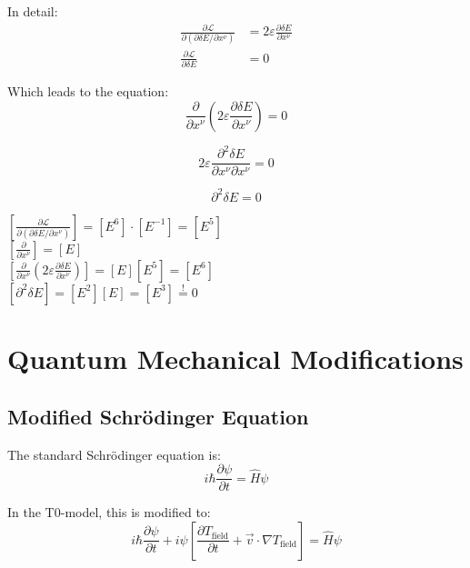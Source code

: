 \documentclass[12pt,a4paper]{article}
\newcommand{\tfield}{T_{\text{field}}}
\newcommand{\dfield}{\delta E}
\theoremstyle{definition}
\begin{document}
	In detail:
	\begin{align}
		\frac{\partial \mathcal{L}}{\partial(\partial \dfield/\partial x^\nu)} &= 2\varepsilon \frac{\partial \dfield}{\partial x^\nu} \\
		\frac{\partial \mathcal{L}}{\partial \dfield} &= 0
	\end{align}
	
	Which leads to the equation:
	\begin{equation}
		\frac{\partial}{\partial x^\nu}\left(2\varepsilon \frac{\partial \dfield}{\partial x^\nu}\right) = 0
	\end{equation}
	
	\begin{equation}
		2\varepsilon \frac{\partial^2 \dfield}{\partial x^\nu \partial x^\nu} = 0
	\end{equation}
	
	\begin{equation}
		\boxed{\partial^2 \dfield = 0}
	\end{equation}
	
	\begin{einheitencheck}
		$[\frac{\partial \mathcal{L}}{\partial(\partial \dfield/\partial x^\nu)}] = [E^6] \cdot [E^{-1}] = [E^5]$\\
		$[\frac{\partial}{\partial x^\nu}] = [E]$\\
		$[\frac{\partial}{\partial x^\nu}\left(2\varepsilon \frac{\partial \dfield}{\partial x^\nu}\right)] = [E][E^5] = [E^6]$\\
		$[\partial^2 \dfield] = [E^2][E] = [E^3] \stackrel{!}{=} 0$ \checkmark
	\end{einheitencheck}
	
	\section{Quantum Mechanical Modifications}
	
	\subsection{Modified Schrödinger Equation}
	
	The standard Schrödinger equation is:
	\begin{equation}
		i \hbar \frac{\partial\psi}{\partial t} = \hat{H}\psi
	\end{equation}
	
	In the T0-model, this is modified to:
	\begin{equation}
		\boxed{i \hbar \frac{\partial\psi}{\partial t} + i\psi\left[\frac{\partial \tfield}{\partial t} + \vec{v} \cdot \nabla \tfield\right] = \hat{H}\psi}
	\end{equation}
	
\end{document}
